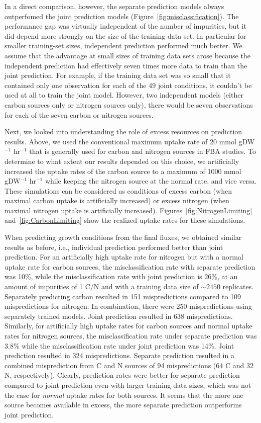 \documentclass[12pt]{article}
\begin{document}
In a direct comparison, however, the separate prediction models always outperfomed the joint prediction models (Figure~\ref{fig:misclassification}). The performance gap was virtually independent of the number of impurities, but it did depend more strongly on the size of the training data set. In particular for smaller training-set sizes, independent prediction performed much better. We assume that the advantage at small sizes of training data sets arose because the independent prediction had effectively seven times more data to train than the joint prediction. For example, if the training data set was so small that it contained only one observation for each of the 49 joint conditions, it couldn't be used at all to train the joint model. However, two independent models (either carbon sources only or nitrogen sources only), there would be seven observations for each of the seven carbon or nitrogen sources.

Next, we looked into understanding the role of excess resources on prediction results. Above, we used the conventional maximum uptake rate of 20 mmol gDW$^{-1}$ hr$^{-1}$ that is generally used for carbon and nitrogen sources in FBA studies. To determine to what extent our results depended on this choice, we artificially increased the uptake rates of the carbon source to a maximum of 1000 mmol gDW$^{-1}$ hr$^{-1}$ while keeping the nitrogen source at the normal rate, and vice versa. These simulations can be considered as conditions of excess carbon (when maximal carbon uptake is artificially increased) or excess nitrogen (when maximal nitrogen uptake is artificially increased). Figures~\ref{fig:NitrogenLimiting} and~\ref{fig:CarbonLimiting} show the realized uptake rates for these simulations.

When predicting growth conditions from the final fluxes, we obtained similar results as before, i.e., individual prediction performed better than joint prediction. For an artificially high uptake rate for nitrogen but with a normal uptake rate for carbon sources, the misclassification rate with separate prediction was 10\%, while the  misclassification rate with joint prediction is 26\%, at an amount of impurities of 1 C/N and with a training data size of $\mathord{\sim}2450$ replicates. Separately predicting carbon resulted in 151 mispredictions compared to 109 mispredictions for nitrogen. In combination, there were 250 mispredictions using separately trained models. Joint prediction resulted in 638 mispredictions. Similarly, for artificially high uptake rates for carbon sources and normal uptake rates for nitrogen sources, the misclassification rate under separate prediction was 3.8\% while the misclassification rate under joint prediction was 14\%. Joint prediction resulted in 324 mispredictions. Separate prediction resulted in a combined misprediction from C and N sources of 94 mispredictions (64 C and 32 N, respectively). Clearly, prediction rates were better for separate prediction compared to joint prediction even with larger training data sizes, which was not the case for \emph{normal} uptake rates for both sources. It seems that the more one source becomes available in excess, the more separate prediction outperforms joint prediction.
\end{document}

